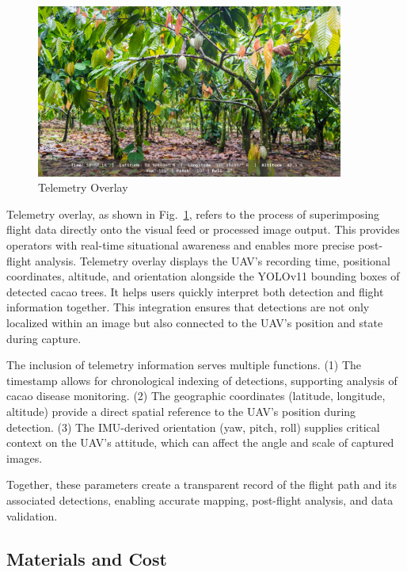\begin{figure}[H]
	\centering
	\caption{Telemetry Overlay}
	\label{fig:telemetry_overlay}
	\includegraphics[width=0.9\textwidth]{figures/Telemetry.pdf}
\end{figure}

Telemetry overlay, as shown in Fig.~\ref{fig:telemetry_overlay}, refers to the process of superimposing flight data directly onto the visual feed or processed image output. This provides operators with real-time situational awareness and enables more precise post-flight analysis. Telemetry overlay displays the UAV’s recording time, positional coordinates, altitude, and orientation alongside the YOLOv11 bounding boxes of detected cacao trees. It helps users quickly interpret both detection and flight information together. This integration ensures that detections are not only localized within an image but also connected to the UAV’s position and state during capture.



The inclusion of telemetry information serves multiple functions.
(1) The timestamp allows for chronological indexing of detections, supporting analysis of cacao disease monitoring.
(2) The geographic coordinates (latitude, longitude, altitude) provide a direct spatial reference to the UAV’s position during detection.
(3) The IMU-derived orientation (yaw, pitch, roll) supplies critical context on the UAV’s attitude, which can affect the angle and scale of captured images.

Together, these parameters create a transparent record of the flight path and its associated detections, enabling accurate mapping, post-flight analysis, and data validation.

\subsection{Materials and Cost}


